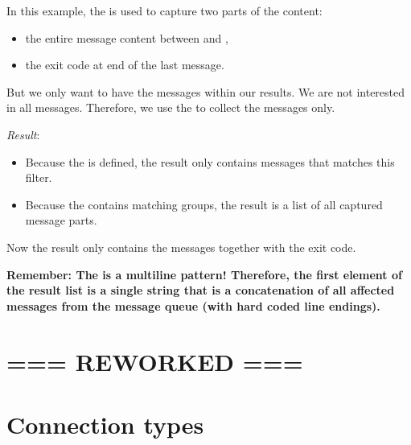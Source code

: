 In this example, the  is used to capture two parts of the content:
\begin{itemize}
   \item the entire message content between  and ,
   \item the exit code at end of the last message.
\end{itemize}

But we only want to have the  messages within our results. We are not interested in all  messages.
Therefore, we use the  to collect the  messages only.

\textit{Result}:
\begin{itemize}
   \item Because the  is defined, the result only contains messages that matches this filter.
   \item Because the  contains matching groups, the result is a list of all captured message parts.
\end{itemize}


Now the result only contains the  messages together with the exit code.

\textbf{Remember: The  is a multiline pattern! Therefore, the first element of the result list is a single string that is a concatenation of all affected messages from
the message queue (with hard coded line endings).}



\vspace{2ex}

\section{=== REWORKED ===}

\newpage

\section{Connection types}


